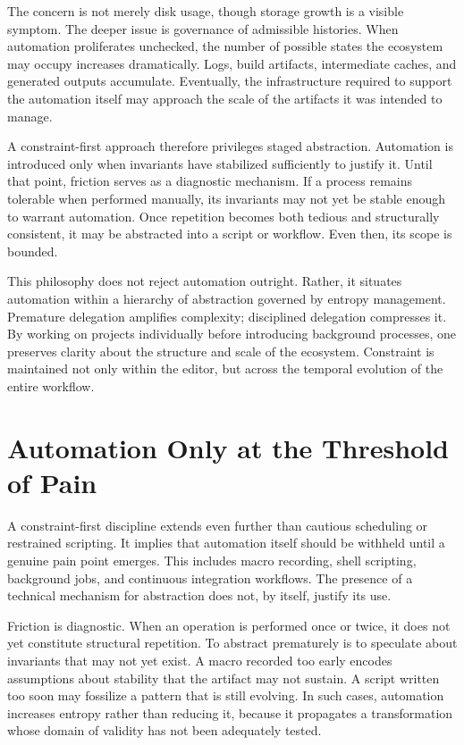 \documentclass[12pt]{article}
\begin{document}
The concern is not merely disk usage, though storage growth is a visible symptom. The deeper issue is governance of admissible histories. When automation proliferates unchecked, the number of possible states the ecosystem may occupy increases dramatically. Logs, build artifacts, intermediate caches, and generated outputs accumulate. Eventually, the infrastructure required to support the automation itself may approach the scale of the artifacts it was intended to manage.

A constraint-first approach therefore privileges staged abstraction. Automation is introduced only when invariants have stabilized sufficiently to justify it. Until that point, friction serves as a diagnostic mechanism. If a process remains tolerable when performed manually, its invariants may not yet be stable enough to warrant automation. Once repetition becomes both tedious and structurally consistent, it may be abstracted into a script or workflow. Even then, its scope is bounded.

This philosophy does not reject automation outright. Rather, it situates automation within a hierarchy of abstraction governed by entropy management. Premature delegation amplifies complexity; disciplined delegation compresses it. By working on projects individually before introducing background processes, one preserves clarity about the structure and scale of the ecosystem. Constraint is maintained not only within the editor, but across the temporal evolution of the entire workflow.

\section{Automation Only at the Threshold of Pain}

A constraint-first discipline extends even further than cautious scheduling or restrained scripting. It implies that automation itself should be withheld until a genuine pain point emerges. This includes macro recording, shell scripting, background jobs, and continuous integration workflows. The presence of a technical mechanism for abstraction does not, by itself, justify its use.

Friction is diagnostic. When an operation is performed once or twice, it does not yet constitute structural repetition. To abstract prematurely is to speculate about invariants that may not yet exist. A macro recorded too early encodes assumptions about stability that the artifact may not sustain. A script written too soon may fossilize a pattern that is still evolving. In such cases, automation increases entropy rather than reducing it, because it propagates a transformation whose domain of validity has not been adequately tested.
\end{document}
